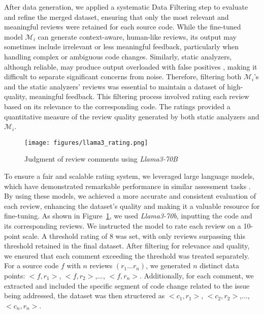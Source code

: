 After data generation, we applied a systematic Data Filtering step to evaluate and refine the merged dataset, ensuring that only the most relevant and meaningful reviews were retained for each source code. While the fine-tuned model \(\mathcal{M}_i\) can generate context-aware, human-like reviews, its output may sometimes include irrelevant or less meaningful feedback, particularly when handling complex or ambiguous code changes. Similarly, static analyzers, although reliable, may produce output overloaded with false positives \cite{johnson2013don, aniche2020effectiveness}, making it difficult to separate significant concerns from noise.
Therefore, filtering both \(\mathcal{M}_i\)'s and the static analyzers' reviews was essential to maintain a dataset of high-quality, meaningful feedback. This filtering process involved rating each review based on its relevance to the corresponding code. The ratings provided a quantitative measure of the review quality generated by both static analyzers and \(\mathcal{M}_i\).


\begin{figure}[hbt!]
  \centering
  \texttt{[image: figures/llama3\_rating.png]}
  \caption{Judgment of review comments using \emph{Llama3-70B}}
  \label{fig:llama3_rating}
\end{figure}


To ensure a fair and scalable rating system, we leveraged large language models, which have demonstrated remarkable performance in similar assessment tasks \cite{zheng2024judging, huang2024empirical, weyssow2024codeultrafeedback}. By using these models, we achieved a more accurate and consistent evaluation of each review, enhancing the dataset's quality and making it a valuable resource for fine-tuning. As shown in Figure~\ref{fig:llama3_rating}, we used \emph{Llama3-70b}, inputting the code and its corresponding reviews. We instructed the model to rate each review on a 10-point scale. A threshold rating of 8 was set, with only reviews surpassing this threshold retained in the final dataset.
After filtering for relevance and quality, we ensured that each comment exceeding the threshold was treated separately. For a source code \(f\) with \(n\) reviews \((r_1...r_n)\), we generated \(n\) distinct data points: \(<f,r_1>\),  \(<f,r_2>\),..., \(<f,r_n>\). Additionally, for each comment, we extracted and included the specific segment of code change related to the issue being addressed, the dataset was then structered as \(<c_1,r_1>\),  \(<c_2,r_2>\),..., \(<c_n,r_n>\).

